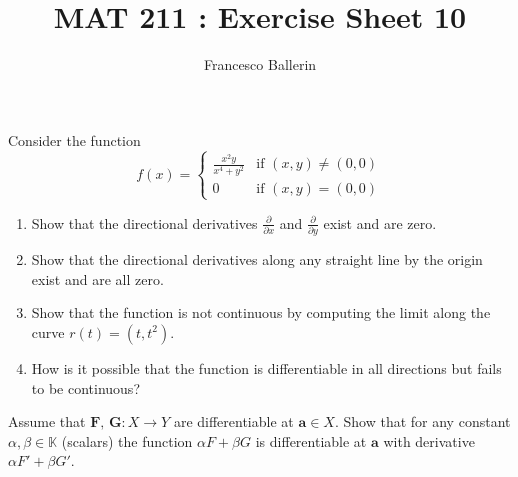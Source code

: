 \documentclass[11pt]{article}%
\title{MAT 211 : Exercise Sheet 10}
\author{Francesco Ballerin}
\date{\color{gray}{\small{francesco.ballerin@uib.no}}}
\begin{document}
\begin{minipage}[t]{\dimexpr \textwidth-6cm-\columnsep}
     \maketitle
\end{minipage}
\hfill\noindent{}

\vspace{50pt}


\bigskip


\begin{Exercise}[title=**$\dagger$]
Consider the function 
\[f(x) = 
\begin{cases} 
	\frac{x^2y}{x^4+y^2} & \text{if } (x,y)\neq(0,0) \\
	0 & \text{if } (x,y)=(0,0)
\end{cases}\]
\begin{enumerate}
	\item Show that the directional derivatives $\frac{\partial}{\partial x}$ and $\frac{\partial}{\partial y}$ exist and are zero.
	\item Show that the directional derivatives along any straight line by the origin exist and are all zero.
	\item Show that the function is not continuous by computing the limit along the curve $r(t)=(t,t^2)$.
	\item How is it possible that the function is differentiable in all directions but fails to be continuous?
\end{enumerate}
\end{Exercise}

\begin{Exercise}[title=*$\dagger$]
	Assume that $\textbf{F, G}:X\to Y$ are differentiable at $\textbf{a}\in X$. Show that for any constant $\alpha, \beta \in\mathbb K$ (scalars) the function $\alpha F+\beta G$ is differentiable at $\textbf{a}$ with derivative $\alpha F'+\beta G'$.
\end{Exercise}
\end{document}
